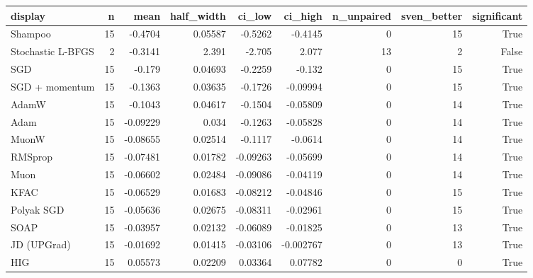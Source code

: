 \begin{tabular}{lrrrrrrrr}
\toprule
display & n & mean & half\_width & ci\_low & ci\_high & n\_unpaired & sven\_better & significant \\
\midrule
Shampoo & 15 & -0.4704 & 0.05587 & -0.5262 & -0.4145 & 0 & 15 & True \\
Stochastic L-BFGS & 2 & -0.3141 & 2.391 & -2.705 & 2.077 & 13 & 2 & False \\
SGD & 15 & -0.179 & 0.04693 & -0.2259 & -0.132 & 0 & 15 & True \\
SGD + momentum & 15 & -0.1363 & 0.03635 & -0.1726 & -0.09994 & 0 & 15 & True \\
AdamW & 15 & -0.1043 & 0.04617 & -0.1504 & -0.05809 & 0 & 14 & True \\
Adam & 15 & -0.09229 & 0.034 & -0.1263 & -0.05828 & 0 & 14 & True \\
MuonW & 15 & -0.08655 & 0.02514 & -0.1117 & -0.0614 & 0 & 14 & True \\
RMSprop & 15 & -0.07481 & 0.01782 & -0.09263 & -0.05699 & 0 & 14 & True \\
Muon & 15 & -0.06602 & 0.02484 & -0.09086 & -0.04119 & 0 & 14 & True \\
KFAC & 15 & -0.06529 & 0.01683 & -0.08212 & -0.04846 & 0 & 15 & True \\
Polyak SGD & 15 & -0.05636 & 0.02675 & -0.08311 & -0.02961 & 0 & 15 & True \\
SOAP & 15 & -0.03957 & 0.02132 & -0.06089 & -0.01825 & 0 & 13 & True \\
JD (UPGrad) & 15 & -0.01692 & 0.01415 & -0.03106 & -0.002767 & 0 & 13 & True \\
HIG & 15 & 0.05573 & 0.02209 & 0.03364 & 0.07782 & 0 & 0 & True \\
\bottomrule
\end{tabular}
